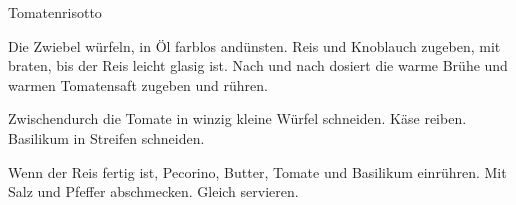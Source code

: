 \begin{recipe}[\vegetarian]{Tomatenrisotto}
    
    \begin{ingredients}
    \end{ingredients}

    \begin{instructions}
        Die Zwiebel würfeln, in Öl farblos andünsten.
        Reis und Knoblauch zugeben, mit braten, bis der Reis leicht glasig ist.
        Nach und nach dosiert die warme Brühe und warmen Tomatensaft zugeben und rühren.

        Zwischendurch die Tomate in winzig kleine Würfel schneiden.
        Käse reiben.
        Basilikum in Streifen schneiden.

        Wenn der Reis fertig ist, Pecorino, Butter, Tomate und Basilikum einrühren.
        Mit Salz und Pfeffer abschmecken.
        Gleich servieren. 
    \end{instructions}
\end{recipe}
